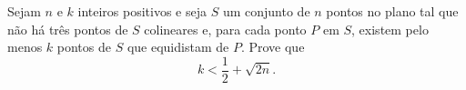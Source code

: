 Sejam $n$ e $k$ inteiros positivos e seja $S$ um conjunto de $n$ pontos no plano tal que não há três pontos de $S$ colineares e, para cada ponto $P$ em $S$, existem pelo menos $k$ pontos de $S$ que equidistam de $P$. Prove que \[ k < \frac {1}{2} + \sqrt {2n}.\]
